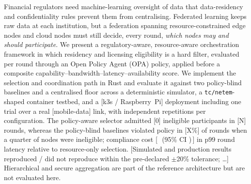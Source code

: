 Financial regulators need machine-learning oversight of data that data-residency and confidentiality rules
prevent them from centralising. Federated learning keeps raw data at each institution, but a federation spanning
resource-constrained edge nodes and cloud nodes must still decide, every round, \emph{which nodes may and
should participate}. We present a regulatory-aware, resource-aware orchestration framework in which residency
and licensing eligibility is a hard filter, evaluated per round through an Open Policy Agent (OPA) policy,
applied before a composite capability--bandwidth--latency--availability score. We implement the selection and
coordination path in Rust and evaluate it against two policy-blind baselines and a centralised floor across
a deterministic simulator, a \texttt{tc/netem}-shaped container testbed, and a
[k3s / Raspberry~Pi] deployment including one trial over a real [mobile-data] link, with \NumReps{} independent
repetitions per configuration. The policy-aware selector admitted [0] ineligible participants
in [N] rounds, whereas the policy-blind baselines violated policy in [X\%] of rounds when a quarter of nodes were ineligible;
compliance cost [\,\HTwoRatioEmu\ (95\% CI \HTwoRatioCIEmu)\,] in p99 round latency relative to resource-only selection.
[Simulated and production results reproduced / did not reproduce within the pre-declared $\pm$20\% tolerance; \ldots]
Hierarchical and secure aggregation are part of the reference architecture but are not evaluated here.
